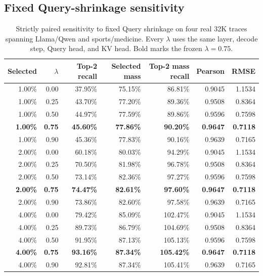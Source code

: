 \subsection{Fixed Query-shrinkage sensitivity}
\label{app:shrinkage-sensitivity}
\begin{table}[t]
\caption{Strictly paired sensitivity to fixed Query shrinkage on four real 32K traces spanning Llama/Qwen and sports/medicine. Every $\lambda$ uses the same layer, decode step, Query head, and KV head. Bold marks the frozen $\lambda=0.75$.}
\label{tab:shrinkage-grid}
\centering\small
\begin{tabular}{rrrrrrr}
\toprule
Selected & $\lambda$ & Top-2 recall & Selected mass & Top-2 mass recall & Pearson & RMSE \\
\midrule
1.00\% & 0.00 & 37.95\% & 75.15\% & 86.81\% & 0.9045 & 1.1534 \\
1.00\% & 0.25 & 43.70\% & 77.20\% & 89.36\% & 0.9508 & 0.8364 \\
1.00\% & 0.50 & 44.97\% & 77.59\% & 89.86\% & 0.9596 & 0.7598 \\
\textbf{1.00\%} & \textbf{0.75} & \textbf{45.60\%} & \textbf{77.86\%} & \textbf{90.20\%} & \textbf{0.9647} & \textbf{0.7118} \\
1.00\% & 0.90 & 45.36\% & 77.83\% & 90.16\% & 0.9639 & 0.7165 \\
2.00\% & 0.00 & 60.18\% & 80.03\% & 94.29\% & 0.9045 & 1.1534 \\
2.00\% & 0.25 & 70.50\% & 81.98\% & 96.78\% & 0.9508 & 0.8364 \\
2.00\% & 0.50 & 73.14\% & 82.36\% & 97.27\% & 0.9596 & 0.7598 \\
\textbf{2.00\%} & \textbf{0.75} & \textbf{74.47\%} & \textbf{82.61\%} & \textbf{97.60\%} & \textbf{0.9647} & \textbf{0.7118} \\
2.00\% & 0.90 & 73.86\% & 82.60\% & 97.58\% & 0.9639 & 0.7165 \\
4.00\% & 0.00 & 79.42\% & 85.09\% & 102.47\% & 0.9045 & 1.1534 \\
4.00\% & 0.25 & 89.73\% & 86.79\% & 104.69\% & 0.9508 & 0.8364 \\
4.00\% & 0.50 & 91.95\% & 87.13\% & 105.13\% & 0.9596 & 0.7598 \\
\textbf{4.00\%} & \textbf{0.75} & \textbf{93.16\%} & \textbf{87.34\%} & \textbf{105.42\%} & \textbf{0.9647} & \textbf{0.7118} \\
4.00\% & 0.90 & 92.81\% & 87.34\% & 105.41\% & 0.9639 & 0.7165 \\
\bottomrule
\end{tabular}
\end{table}


